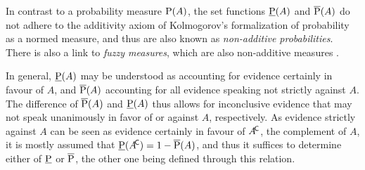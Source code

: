 In contrast to a probability measure $\operatorname{P}(A)$,
the set functions $\underline{\operatorname{P}}(A)$ and $\overline{\operatorname{P}}(A)$ do not adhere
to the additivity axiom of Kolmogorov's \parencite*{1933:kolmogorov}
formalization of probability as a normed measure,
and thus are also known as \emph{non-additive probabilities}.
There is also a link to \emph{fuzzy measures}, which are also non-additive measures
\parencite[see, e.g.,][]{1997:denneberg}.

In general, $\underline{\operatorname{P}}(A)$ may be understood as accounting for evidence certainly in favour of $A$,
and $\overline{\operatorname{P}}(A)$ accounting for all evidence speaking not strictly against $A$.
The difference of $\overline{\operatorname{P}}(A)$ and $\underline{\operatorname{P}}(A)$ thus allows for inconclusive evidence
that may not speak unanimously in favor of or against $A$, respectively.
As evidence strictly against $A$ can be seen as evidence certainly in favour of $A^{{\mbox{\!\scriptsize\textsf{C}}}}$,
the complement of $A$,
it is mostly assumed that $\underline{\operatorname{P}}(A^{{\mbox{\!\scriptsize\textsf{C}}}}) = 1 - \overline{\operatorname{P}}(A)$,
and thus it suffices to determine either of $\underline{\operatorname{P}}$ or $\overline{\operatorname{P}}$,
the other one being defined through this relation.

